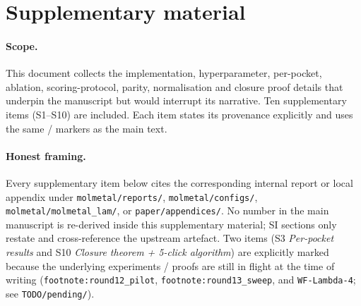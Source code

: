 %
%

\section*{Supplementary material}

\paragraph{Scope.}
This document collects the implementation, hyperparameter, per-pocket,
ablation, scoring-protocol, parity, normalisation and closure proof
details that underpin the manuscript but would interrupt its narrative.
Ten supplementary items (S1--S10) are included.  Each item states its
provenance explicitly and uses the same \MEASURED{}/\DESIGN{} markers as
the main text.

\paragraph{Honest framing.}
Every supplementary item below cites the corresponding internal report
or local appendix under \texttt{molmetal/reports/},
\texttt{molmetal/configs/}, \texttt{molmetal/molmetal\_lam/}, or
\texttt{paper/appendices/}.  No number in the main manuscript is
re-derived inside this supplementary material; SI sections only restate
and cross-reference the upstream artefact.  Two items (S3
\emph{Per-pocket results} and S10 \emph{Closure theorem + 5-click
algorithm}) are explicitly marked \DESIGN{} because the underlying
experiments / proofs are still in flight at the time of writing
(\texttt{footnote:round12\_pilot}, \texttt{footnote:round13\_sweep},
and \texttt{WF-Lambda-4}; see \texttt{TODO/pending/}).

